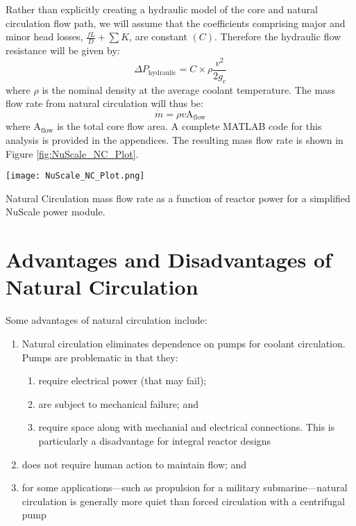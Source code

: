 Rather than explicitly creating a hydraulic model of the core and natural circulation flow path, we will assume that the coefficients comprising major and minor head losses, $\frac{fL}{D} + \sum{K}$, are constant $(C)$.  Therefore the hydraulic flow resistance will be given by:
$$\Delta P_{\text{hydraulic}} = C \times \rho \frac{v^2}{2 g_c}$$
where $\rho$ is the nominal density at the average coolant temperature.  The mass flow rate from natural circulation will thus be: 
$$\dot{m} = \rho v \text{A}_{\text{flow}}$$
where $\text{A}_{\text{flow}}$ is the total core flow area.  A complete MATLAB code for this analysis is provided in the appendices.  The resulting mass flow rate is shown in Figure \ref{fig:NuScale_NC_Plot}.
\begin{marginfigure}
\texttt{[image: NuScale\_NC\_Plot.png]}
\caption{Natural Circulation mass flow rate as a function of reactor power for a simplified NuScale power module.}
\label{fig:NuScale_NC_Plot}
\end{marginfigure}

\section{Advantages and Disadvantages of Natural Circulation}
Some advantages of natural circulation include:
\begin{enumerate}
\item Natural circulation eliminates dependence on pumps for coolant circulation. Pumps are problematic in that they:
\begin{enumerate}
\item require electrical power (that may fail);
\item are subject to mechanical failure; and
\item require space along with mechanial and electrical connections.  This is particularly a disadvantage for integral reactor designs
\end{enumerate}
\item does not require human action to maintain flow; and
\item for some applications---such as propulsion for a military submarine---natural circulation is generally more quiet than forced circulation with a centrifugal pump
\end{enumerate}

